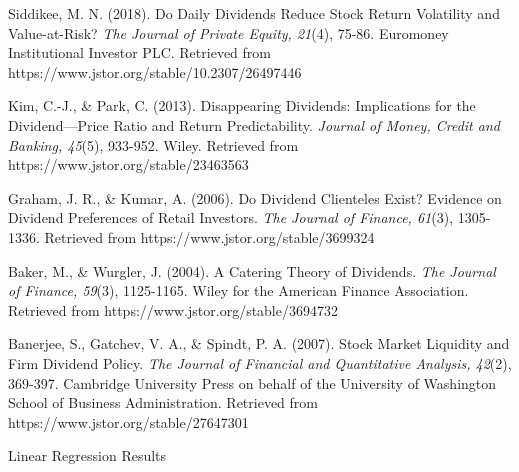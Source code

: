 \documentclass[12pt]{article}
\begin{document}
\newpage
\begin{thebibliography}{99}

 Siddikee, M. N. (2018). Do Daily Dividends Reduce Stock Return Volatility and Value-at-Risk? \textit{The Journal of Private Equity, 21}(4), 75-86. Euromoney Institutional Investor PLC. Retrieved from https://www.jstor.org/stable/10.2307/26497446

 Kim, C.-J., \& Park, C. (2013). Disappearing Dividends: Implications for the Dividend—Price Ratio and Return Predictability. \textit{Journal of Money, Credit and Banking, 45}(5), 933-952. Wiley. Retrieved from https://www.jstor.org/stable/23463563

 Graham, J. R., \& Kumar, A. (2006). Do Dividend Clienteles Exist? Evidence on Dividend Preferences of Retail Investors. \textit{The Journal of Finance, 61}(3), 1305-1336. Retrieved from https://www.jstor.org/stable/3699324

 Baker, M., \& Wurgler, J. (2004). A Catering Theory of Dividends. \textit{The Journal of Finance, 59}(3), 1125-1165. Wiley for the American Finance Association. Retrieved from https://www.jstor.org/stable/3694732

 Banerjee, S., Gatchev, V. A., \& Spindt, P. A. (2007). Stock Market Liquidity and Firm Dividend Policy. \textit{The Journal of Financial and Quantitative Analysis, 42}(2), 369-397. Cambridge University Press on behalf of the University of Washington School of Business Administration. Retrieved from https://www.jstor.org/stable/27647301

\end{thebibliography}

\newpage %

\begin{frame}{Linear Regression Results}
\centering
\end{frame}
\end{document}
